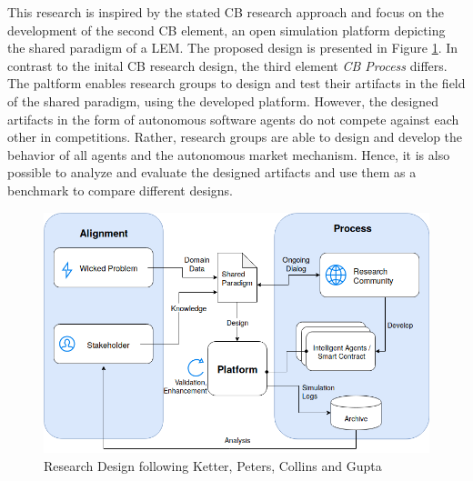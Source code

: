 This research is inspired by the stated CB research approach and focus on the development of the second CB element, an open simulation platform depicting the shared paradigm of a LEM. The proposed design is presented in Figure \ref{figure:competitive_benchmarking}. In contrast to the inital CB research design, the third element \textit{CB Process} differs. The paltform enables research groups to design and test their artifacts in the field of the shared paradigm, using the developed platform. However, the designed artifacts in the form of autonomous software agents do not compete against each other in competitions. Rather, research groups are able to design and develop the behavior of all agents and the autonomous market mechanism. Hence, it is also possible to analyze and evaluate the designed artifacts and use them as a benchmark to compare different designs. 

\begin{figure}[htbp]
	\centering
	\includegraphics[width=1\linewidth]{./figures/competitive_benchmarking.png}
	\caption{Research Design following Ketter, Peters, Collins and Gupta \cite{ketter2015competitive}}
	\label{figure:competitive_benchmarking}
\end{figure}

